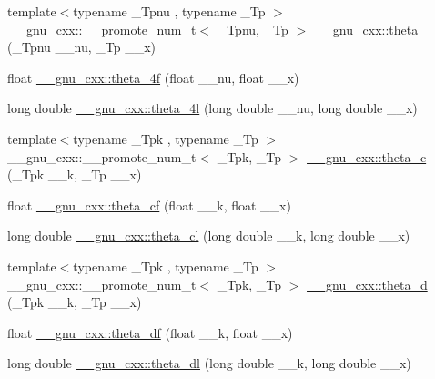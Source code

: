 \begin{DoxyCompactItemize}
\item 
{\footnotesize template$<$typename \+\_\+\+Tpnu , typename \+\_\+\+Tp $>$ }\\\+\_\+\+\_\+gnu\+\_\+cxx\+::\+\_\+\+\_\+promote\+\_\+num\+\_\+t$<$ \+\_\+\+Tpnu, \+\_\+\+Tp $>$ \hyperlink{group__gnu__math__spec__func_ga7b4afc32eb3f1d7c49662cd37af56a20}{\+\_\+\+\_\+gnu\+\_\+cxx\+::theta\+\_} (\+\_\+\+Tpnu \+\_\+\+\_\+nu, \+\_\+\+Tp \+\_\+\+\_\+x)
\item 
float \hyperlink{group__gnu__math__spec__func_ga0c5cbf87e304844ed4c3423be5ca09a5}{\+\_\+\+\_\+gnu\+\_\+cxx\+::theta\+\_\+4f} (float \+\_\+\+\_\+nu, float \+\_\+\+\_\+x)
\item 
long double \hyperlink{group__gnu__math__spec__func_gaaf63a80e90cdcdd66ebb18cd3a84afae}{\+\_\+\+\_\+gnu\+\_\+cxx\+::theta\+\_\+4l} (long double \+\_\+\+\_\+nu, long double \+\_\+\+\_\+x)
\item 
{\footnotesize template$<$typename \+\_\+\+Tpk , typename \+\_\+\+Tp $>$ }\\\+\_\+\+\_\+gnu\+\_\+cxx\+::\+\_\+\+\_\+promote\+\_\+num\+\_\+t$<$ \+\_\+\+Tpk, \+\_\+\+Tp $>$ \hyperlink{group__gnu__math__spec__func_gad2326374205feca04a9996af0a4ebd2a}{\+\_\+\+\_\+gnu\+\_\+cxx\+::theta\+\_\+c} (\+\_\+\+Tpk \+\_\+\+\_\+k, \+\_\+\+Tp \+\_\+\+\_\+x)
\item 
float \hyperlink{group__gnu__math__spec__func_ga409f898afeaad5e25726ad552cfe6946}{\+\_\+\+\_\+gnu\+\_\+cxx\+::theta\+\_\+cf} (float \+\_\+\+\_\+k, float \+\_\+\+\_\+x)
\item 
long double \hyperlink{group__gnu__math__spec__func_ga0531098c628999cf396217ff997cfdda}{\+\_\+\+\_\+gnu\+\_\+cxx\+::theta\+\_\+cl} (long double \+\_\+\+\_\+k, long double \+\_\+\+\_\+x)
\item 
{\footnotesize template$<$typename \+\_\+\+Tpk , typename \+\_\+\+Tp $>$ }\\\+\_\+\+\_\+gnu\+\_\+cxx\+::\+\_\+\+\_\+promote\+\_\+num\+\_\+t$<$ \+\_\+\+Tpk, \+\_\+\+Tp $>$ \hyperlink{group__gnu__math__spec__func_ga030a1ea3efa82f6fbaeac0ed2d6191c2}{\+\_\+\+\_\+gnu\+\_\+cxx\+::theta\+\_\+d} (\+\_\+\+Tpk \+\_\+\+\_\+k, \+\_\+\+Tp \+\_\+\+\_\+x)
\item 
float \hyperlink{group__gnu__math__spec__func_gad2dc6fcaf54d25cbfaad082623941118}{\+\_\+\+\_\+gnu\+\_\+cxx\+::theta\+\_\+df} (float \+\_\+\+\_\+k, float \+\_\+\+\_\+x)
\item 
long double \hyperlink{group__gnu__math__spec__func_gacce4474168b9638ebeaad1c7b351fa04}{\+\_\+\+\_\+gnu\+\_\+cxx\+::theta\+\_\+dl} (long double \+\_\+\+\_\+k, long double \+\_\+\+\_\+x)

\end{DoxyCompactItemize}
